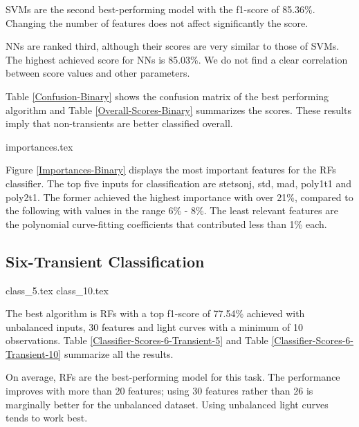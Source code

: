 \documentclass[a4paper,fleqn,usenatbib]{mnras}
\begin{document}
SVMs are the second best-performing model with the f1-score of 85.36\%. 
Changing the number of features does not affect significantly the score.

NNs are ranked third, although their scores are very similar to those of SVMs. 
The highest achieved score for NNs is 85.03\%.
We do not find a clear correlation between score values and other
parameters.  

Table \ref{Confusion-Binary} shows the confusion matrix of the best
performing algorithm and Table \ref{Overall-Scores-Binary} summarizes
the scores.
These results imply that non-transients are better classified overall.  


{importances.tex}

Figure \ref{Importances-Binary} displays the most important features
for the RFs classifier.
The top five inputs for classification are stetson\textunderscore j,
std, mad, poly1\textunderscore t1 and poly2\textunderscore t1.  
The former achieved the highest importance with over 21\%, compared to
the following with values in the range 6\% - 8\%. 
The least relevant features are the polynomial curve-fitting
coefficients that contributed less than 1\% each.


\subsection{Six-Transient Classification}

{class_5.tex}
{class_10.tex}

The best algorithm is RFs with a top f1-score of 77.54\% achieved with 
unbalanced inputs, 30 features and light curves with a minimum of 10
observations. 
Table \ref{Classifier-Scores-6-Transient-5} and Table
\ref{Classifier-Scores-6-Transient-10} summarize all the
results. 
 
On average, RFs are the best-performing model for this task. 
The performance improves with more than 20 features; using 30 features 
rather than 26 is marginally better for the unbalanced dataset. 
Using unbalanced light curves tends to work best.
\end{document}
